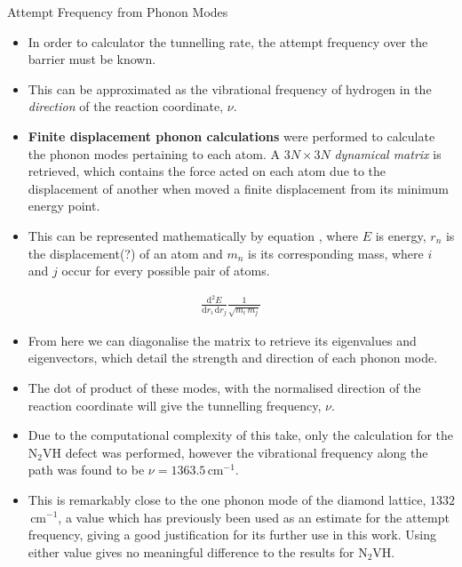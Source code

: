 \documentclass[final]{beamer}
\renewcommand{\d}{\textrm{d}}
\newlength{\colwidth}
\begin{document}
\begin{frame}[t]
\begin{columns}[t]
\begin{column}{\colwidth}
  \begin{block}{Attempt Frequency from Phonon Modes}
    \begin{itemize}
        \item In order to calculator the tunnelling rate, the attempt frequency over the barrier must be known.
        \item This can be approximated as the vibrational frequency of hydrogen in the \emph{direction} of the reaction coordinate, $\nu$.
        \item \textbf{Finite displacement phonon calculations} were performed to calculate the phonon modes pertaining to each atom. A $3N\times3N$ \emph{dynamical matrix} is retrieved, which contains the force acted on each atom due to the displacement of another when moved a finite displacement from its minimum energy point.
        \item This can be represented mathematically by equation , where $E$ is energy, $r_n$ is the displacement(?) of an atom and $m_n$ is its corresponding mass, where $i$ and $j$ occur for every possible pair of atoms.
    \end{itemize}
    \begin{align*}
        \frac{{\d}^2E}{{\d}r_i\,{\d}r_j}\frac{1}{\sqrt{m_i\,m_j}}
    \end{align*}
    \begin{itemize}
        \item From here we can diagonalise the matrix to retrieve its eigenvalues and eigenvectors, which detail the strength and direction of each phonon mode.
        \item The dot of product of these modes, with the normalised direction of the reaction coordinate will give the tunnelling frequency, $\nu$.
        \item Due to the computational complexity of this take, only the calculation for the N$_2$VH defect was performed, however the vibrational frequency along the path was found to be $\nu = 1363.5$\,cm$^{-1}$.
        \item This is remarkably close to the one phonon mode of the diamond lattice, $1332$\,cm$^{-1}$, a value which has previously been used as an estimate for the attempt frequency, giving a good justification for its further use in this work. Using either value gives no meaningful difference to the results for N$_2$VH.
    \end{itemize}

  \end{block}


\end{column}
\end{columns}
\end{frame}
\end{document}
